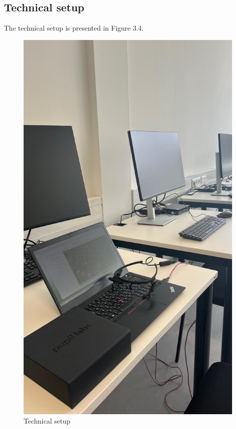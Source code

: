 \subsection{Technical setup}
 The technical setup is presented in Figure 3.4. 

\begin{figure} [H]
  \centering
  \includegraphics[scale=0.25]{figures/setup.png}
  \caption{Technical setup }
  \label{fig:AnhangsChor}
\end{figure}

